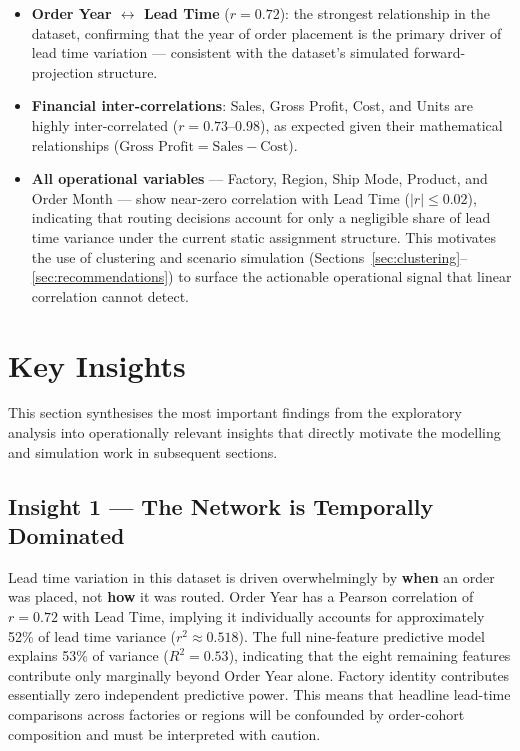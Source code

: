 \documentclass[12pt, a4paper]{article}
\begin{document}
\begin{itemize}[leftmargin=*]
    \item \textbf{Order Year $\leftrightarrow$ Lead Time}
          ($r = 0.72$): the strongest relationship in the dataset,
          confirming that the year of order placement is the
          primary driver of lead time variation --- consistent
          with the dataset's simulated forward-projection
          structure.
    \item \textbf{Financial inter-correlations}: Sales, Gross
          Profit, Cost, and Units are highly inter-correlated
          ($r = 0.73$--$0.98$), as expected given their
          mathematical relationships
          ($\text{Gross Profit} = \text{Sales} - \text{Cost}$).
    \item \textbf{All operational variables} --- Factory, Region,
          Ship Mode, Product, and Order Month --- show near-zero
          correlation with Lead Time ($|r| \leq 0.02$),
          indicating that routing decisions account for only a
          negligible share of lead time variance under the
          current static assignment structure. This motivates
          the use of clustering and scenario simulation
          (Sections~\ref{sec:clustering}--\ref{sec:recommendations})
          to surface the actionable operational signal that
          linear correlation cannot detect.
\end{itemize}

\section{Key Insights}
\label{sec:insights}

This section synthesises the most important findings from the
exploratory analysis into operationally relevant insights that
directly motivate the modelling and simulation work in subsequent
sections.

\subsection{Insight 1 --- The Network is Temporally Dominated}

Lead time variation in this dataset is driven overwhelmingly by
\textbf{when} an order was placed, not \textbf{how} it was routed.
Order Year has a Pearson correlation of $r = 0.72$ with Lead Time,
implying it individually accounts for approximately 52\% of lead
time variance ($r^2 \approx 0.518$).
The full nine-feature predictive model explains 53\% of variance
($R^2 = 0.53$), indicating that the eight remaining features
contribute only marginally beyond Order Year alone.
Factory identity contributes essentially zero independent predictive
power. This means that headline lead-time comparisons across factories
or regions will be confounded by order-cohort composition and must
be interpreted with caution.
\end{document}
